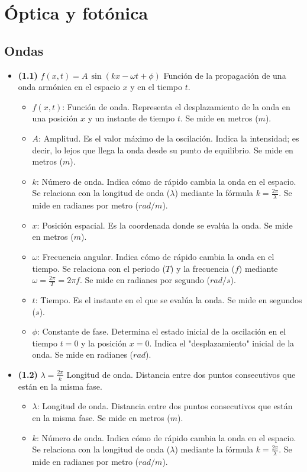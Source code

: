 \documentclass{article}
\begin{document}
	\section{Óptica y fotónica}
		\subsection*{Ondas}
			\begin{itemize}
				\item \textbf{(1.1)} $\boxed{f(x,t)=A\,\sin(kx-\omega t+\phi)}$ Función de la propagación de una onda armónica en el espacio $x$ y en el tiempo $t$.
					\begin{itemize}
						\item $f(x,t)$: Función de onda. Representa el desplazamiento de la onda en una posición $x$ y un instante de tiempo $t$. Se mide en metros ($m$).
						\item $A$: Amplitud. Es el valor máximo de la oscilación. Indica la intensidad; es decir, lo lejos que llega la onda desde su punto de equilibrio. Se mide en metros ($m$).
						\item $k$: Número de onda. Indica cómo de rápido cambia la onda en el espacio. Se relaciona con la longitud de onda ($\lambda$) mediante la fórmula $k = \frac{2\pi}{\lambda}$. Se mide en radianes por metro ($rad/m$).
						\item $x$: Posición espacial. Es la coordenada donde se evalúa la onda. Se mide en metros ($m$).
						\item $\omega$: Frecuencia angular. Indica cómo de rápido cambia la onda en el tiempo. Se relaciona con el periodo ($T$) y la frecuencia ($f$) mediante $\omega = \frac{2\pi}{T} = 2\pi f$. Se mide en radianes por segundo ($rad/s$).
						\item $t$: Tiempo. Es el instante en el que se evalúa la onda. Se mide en segundos ($s$).
						\item $\phi$: Constante de fase. Determina el estado inicial de la oscilación en el tiempo $t=0$ y la posición $x=0$. Indica el "desplazamiento" inicial de la onda. Se mide en radianes ($rad$).
					\end{itemize}

				\item \textbf{(1.2)} $\boxed{\lambda=\frac{2\pi}{k}}$ Longitud de onda. Distancia entre dos puntos consecutivos que están en la misma fase.
					\begin{itemize}
						\item $\lambda$: Longitud de onda. Distancia entre dos puntos consecutivos que están en la misma fase. Se mide en metros ($m$).
						\item $k$: Número de onda. Indica cómo de rápido cambia la onda en el espacio. Se relaciona con la longitud de onda ($\lambda$) mediante la fórmula $k = \frac{2\pi}{\lambda}$. Se mide en radianes por metro ($rad/m$).
					\end{itemize}


\end{itemize}
\end{document}
